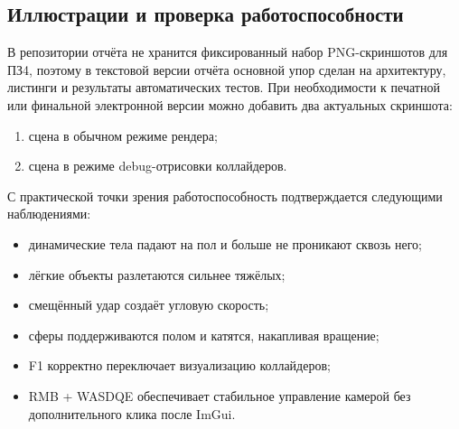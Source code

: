 \documentclass[a4paper,14pt]{extarticle}
\begin{document}
\subsection{Иллюстрации и проверка работоспособности}
В репозитории отчёта не хранится фиксированный набор PNG-скриншотов для ПЗ4, поэтому в текстовой версии отчёта основной упор сделан на архитектуру, листинги и результаты автоматических тестов. При необходимости к печатной или финальной электронной версии можно добавить два актуальных скриншота:
\begin{enumerate}
  \item сцена в обычном режиме рендера;
  \item сцена в режиме debug-отрисовки коллайдеров.
\end{enumerate}

С практической точки зрения работоспособность подтверждается следующими наблюдениями:
\begin{itemize}
  \item динамические тела падают на пол и больше не проникают сквозь него;
  \item лёгкие объекты разлетаются сильнее тяжёлых;
  \item смещённый удар создаёт угловую скорость;
  \item сферы поддерживаются полом и катятся, накапливая вращение;
  \item F1 корректно переключает визуализацию коллайдеров;
  \item RMB + WASDQE обеспечивает стабильное управление камерой без дополнительного клика после ImGui.
\end{itemize}
\end{document}
